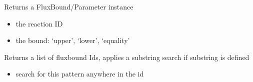 \documentclass[letterpaper,10pt,english]{sphinxmanual}
\begin{document}
\begin{fulllineitems}
\begin{fulllineitems}
\begin{itemize}
\end{itemize}

\end{fulllineitems}


\begin{fulllineitems}
\label{\detokenize{modules_doc:cbmpy.CBModel.Model.getFluxBoundByReactionID}}
\pysigstartsignatures
{}
\pysigstopsignatures
\sphinxAtStartPar
Returns a FluxBound/Parameter instance
\begin{itemize}
\item {} 
\sphinxAtStartPar
{} the reaction ID

\item {} 
\sphinxAtStartPar
{} the bound: ‘upper’, ‘lower’, ‘equality’

\end{itemize}

\end{fulllineitems}


\begin{fulllineitems}
\label{\detokenize{modules_doc:cbmpy.CBModel.Model.getFluxBoundIds}}
\pysigstartsignatures
{}
\pysigstopsignatures
\sphinxAtStartPar
Returns a list of fluxbound Ids, applies a substring search if substring is defined
\begin{itemize}
\item {} 
\sphinxAtStartPar
{} search for this pattern anywhere in the id

\end{itemize}

\end{fulllineitems}



\end{fulllineitems}
\end{document}
